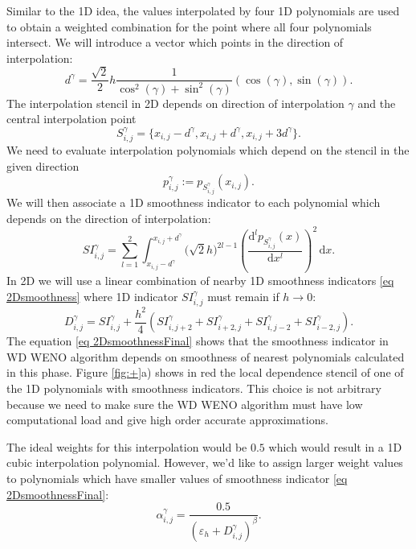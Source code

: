 	Similar to the 1D idea, the values interpolated by four 1D polynomials are used to obtain a weighted combination for the point where all four polynomials intersect. We will introduce a vector which points in the direction of interpolation:
	\begin{equation}\label{eq:Vektor}
		d^{\gamma}=\frac{\sqrt{2}}{2}h\frac{1}{\cos^2(\gamma)+\sin^2(\gamma)}(\cos(\gamma),\sin(\gamma)).
	\end{equation}
	The interpolation stencil in 2D depends on direction of interpolation $\gamma$ and the central interpolation point
	\begin{equation}
		S_{i,j}^{\gamma}=\{x_{i,j}-d^{\gamma},x_{i,j}+d^{\gamma},x_{i,j}+3d^{\gamma}\}.
	\end{equation}
	We need to evaluate interpolation polynomials which depend on the stencil in the given direction
	\begin{equation}
		p_{i,j}^\gamma:=p_{S_{i,j}^{\gamma}}(x_{i,j}).
		\label{eq:p}
	\end{equation}
	We will then associate a 1D smoothness indicator to each polynomial which depends on the direction of interpolation: 
	\begin{equation}\label{eq 2Dsmoothness}
		SI_{i,j}^\gamma=\sum_{l=1}^{2} \int_{x_{i,j}-d^{\gamma}}^{x_{i,j}+d^{\gamma}} \Big(\sqrt{2}h\Big)^{2l-1}
		\left( \frac{\textrm{d}^{l}p_{S_{i,j}^{\gamma}}(x)}{\textrm{d}x^{l}} \right)^{2} \,\textrm{d}x{.}
	\end{equation}
	In 2D we will use a linear combination of nearby 1D smoothness indicators  \eqref{eq 2Dsmoothness} where 1D indicator  $SI_{i,j}^\gamma$ must remain if $h \to 0$:
	\begin{equation}\label{eq 2DsmoothnessFinal}
		D_{i,j}^\gamma= SI_{i,j}^\gamma+ \frac{h^2}{4}(SI_{i,j+2}^\gamma+SI_{i+2,j}^\gamma+SI_{i,j-2}^\gamma+SI_{i-2,j}^\gamma){.} 
	\end{equation}
	The equation \eqref{eq 2DsmoothnessFinal} shows that the smoothness indicator in {WD} WENO algorithm depends on smoothness of nearest polynomials calculated in this phase. Figure \ref{fig:+}a) shows in red the local dependence stencil of one of the 1D polynomials with smoothness indicators. This choice is not arbitrary because we need to make sure the {WD} WENO algorithm must have low computational load and give high order accurate approximations.
	  
	The ideal weights for this interpolation would be $0.5$ which would result in a 1D cubic interpolation polynomial. 
	However, we'd like to assign larger weight values to polynomials which have smaller values of smoothness indicator  \eqref{eq 2DsmoothnessFinal}:
	\begin{equation}
		\alpha_{i,j}^\gamma=\frac{0.5}{(\varepsilon_h+D_{i,j}^\gamma)^{\beta}}.
		\label{eq:alpha}
	\end{equation}
	
